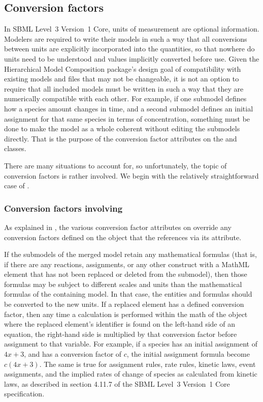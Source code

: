 \subsection{Conversion factors}
\label{conversion-factors}

In SBML Level~3 Version~1 Core, units of measurement are optional
information.  Modelers are required to write their models in such a way
that all conversions between units are explicitly incorporated into the
quantities, so that nowhere do units need to be understood and values
implicitly converted before use.  Given the Hierarchical Model
Composition package's design goal of compatibility with existing models
and files that may not be changeable, it is not an option to require
that all included models must be written in such a way that they are
numerically compatible with each other.  For example, if one submodel
defines how a species amount changes in time, and a second submodel
defines an initial assignment for that same species in terms of
concentration, something must be done to make the model as a whole
coherent without editing the submodels directly.  That is the purpose of
the conversion factor attributes on the \Submodel and \ReplacedElement
classes.

There are many situations to account for, so unfortunately, the topic of
conversion factors is rather involved.  We begin with the relatively
straightforward case of \ReplacedElement.


\subsubsection{Conversion factors involving }

As explained in , the various conversion
factor attributes on \ReplacedElement override any conversion factors
defined on the \Submodel object that the \ReplacedElement references via
its  attribute.

If the submodels of the merged model retain any mathematical formulas
(that is, if there are any reactions, assignments, or any other
construct with a MathML  element that has not been
replaced or deleted from the submodel), then those formulas may be
subject to different scales and units than the mathematical formulas of
the containing model.  In that case, the entities and formulas should be
converted to the new units.  If a replaced element has a defined
conversion factor, then any time a calculation is performed within the
math of the \Submodel object where the replaced element's identifier is
found on the left-hand side of an equation, the right-hand side is
multiplied by that conversion factor before assignment to that variable.
For example, if a species has an initial assignment of $4x + 3$, and has
a conversion factor of $c$, the initial assignment formula become
$c (4x+3)$.  The same is true for assignment rules, rate
rules, kinetic laws, event assignments, and the implied rates of change
of species as calculated from kinetic laws, as described in section
4.11.7 of the SBML Level~3 Version~1 Core specification.

